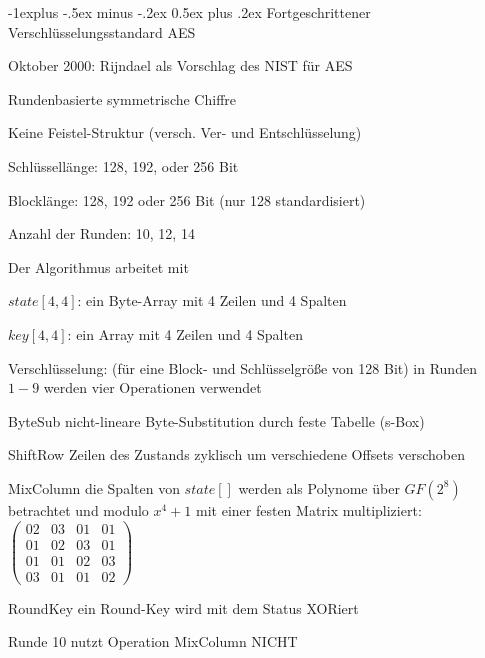 \documentclass[a4paper]{article}
\makeatletter
\renewcommand{\subsection}{\@startsection{subsection}{2}{0mm}%
 {-1explus -.5ex minus -.2ex}%
 {0.5ex plus .2ex}%
 {\normalfont\normalsize\bfseries}}
\makeatother
\begin{document}
\begin{multicols}{3}
      \subsection{Fortgeschrittener Verschlüsselungsstandard AES}
      \begin{itemize*}
            \item Oktober 2000: Rijndael als Vorschlag des NIST für AES
            \item Rundenbasierte symmetrische Chiffre
            \item Keine Feistel-Struktur (versch. Ver- und Entschlüsselung)
            \item Schlüssellänge: 128, 192, oder 256 Bit
            \item Blocklänge: 128, 192 oder 256 Bit (nur 128 standardisiert)
            \item Anzahl der Runden: 10, 12, 14
            \item Der Algorithmus arbeitet mit
            \begin{itemize*}
                  \item $state[4, 4]$: ein Byte-Array mit 4 Zeilen und 4 Spalten %
                  \item $key[4, 4]$: ein Array mit 4 Zeilen und 4 Spalten %
            \end{itemize*}
            \item Verschlüsselung: (für eine Block- und Schlüsselgröße von 128 Bit) in Runden $1-9$ werden vier Operationen verwendet
            \begin{description*}
                  \item[ByteSub] nicht-lineare Byte-Substitution durch feste Tabelle (s-Box)
                  \item[ShiftRow] Zeilen des Zustands zyklisch um verschiedene Offsets verschoben
                  \item[MixColumn] die Spalten von $state[]$ werden als Polynome über $GF(2^8)$ betrachtet und modulo $x^4+1$ mit einer festen Matrix multipliziert: $\begin{pmatrix} 02&03&01&01\\ 01&02&03&01 \\ 01&01&02&03\\ 03&01&01&02 \end{pmatrix}$
                  \item[RoundKey] ein Round-Key wird mit dem Status XORiert
                  \item[Runde 10] nutzt Operation MixColumn NICHT

\end{description*}
\end{itemize*}
\end{multicols}
\end{document}
